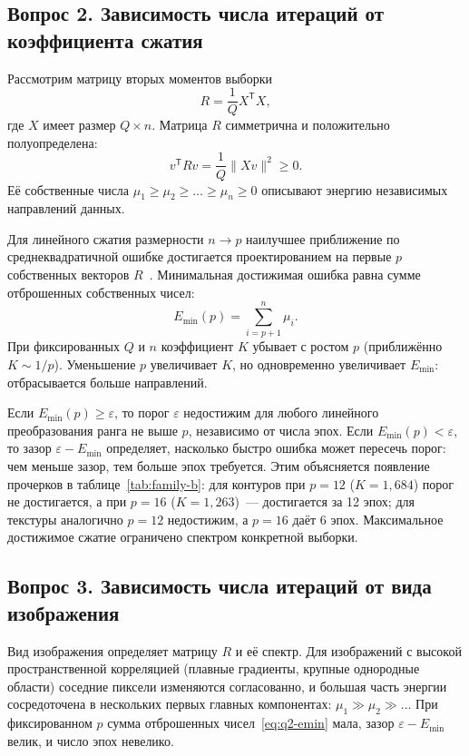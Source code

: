 \subsection{Вопрос 2. Зависимость числа итераций от коэффициента сжатия}

Рассмотрим матрицу вторых моментов выборки
\begin{equation}
	R=\frac{1}{Q}X^{\mathsf{T}}X,
	\label{eq:q2-r}
\end{equation}
где $X$ имеет размер $Q \times n$. Матрица $R$ симметрична и положительно полуопределена:
\begin{equation}
	v^{\mathsf{T}}Rv=\frac{1}{Q}\|Xv\|^2\ge0.
\end{equation}
Её собственные числа $\mu_1\ge\mu_2\ge\ldots\ge\mu_n\ge0$ описывают энергию независимых направлений данных.

Для линейного сжатия размерности $n\to p$ наилучшее приближение по среднеквадратичной ошибке достигается проектированием на первые $p$ собственных векторов $R$~\cite{golovko}. Минимальная достижимая ошибка равна сумме отброшенных собственных чисел:
\begin{equation}
	E_{\min}(p)=\sum_{i=p+1}^{n}\mu_i.
	\label{eq:q2-emin}
\end{equation}
При фиксированных $Q$ и $n$ коэффициент $K$ убывает с ростом $p$ (приближённо $K\sim1/p$). Уменьшение $p$ увеличивает $K$, но одновременно увеличивает $E_{\min}$: отбрасывается больше направлений.

Если $E_{\min}(p)\ge\varepsilon$, то порог $\varepsilon$ недостижим для любого линейного преобразования ранга не выше $p$, независимо от числа эпох. Если $E_{\min}(p)<\varepsilon$, то зазор $\varepsilon-E_{\min}$ определяет, насколько быстро ошибка может пересечь порог: чем меньше зазор, тем больше эпох требуется. Этим объясняется появление прочерков в таблице~\ref{tab:family-b}: для контуров при $p=12$ ($K=1{,}684$) порог не достигается, а при $p=16$ ($K=1{,}263$)~--- достигается за 12 эпох; для текстуры аналогично $p=12$ недостижим, а $p=16$ даёт 6 эпох. Максимальное достижимое сжатие ограничено спектром конкретной выборки.

\subsection{Вопрос 3. Зависимость числа итераций от вида изображения}

Вид изображения определяет матрицу $R$ и её спектр. Для изображений с высокой пространственной корреляцией (плавные градиенты, крупные однородные области) соседние пиксели изменяются согласованно, и большая часть энергии сосредоточена в нескольких первых главных компонентах: $\mu_1\gg\mu_2\gg\ldots$ При фиксированном $p$ сумма отброшенных чисел~\eqref{eq:q2-emin} мала, зазор $\varepsilon-E_{\min}$ велик, и число эпох невелико.

